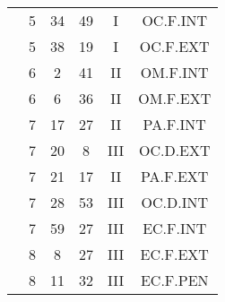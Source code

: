 \documentclass[12pt, a4paper]{article}
\begin{document}
\begin{multicols}{3}
{\begin{tabular}{c c c c c c}
	 	 	 	 & 5 & 34 & 49 & I & OC.F.INT\\%
	 	 	 	 & 5 & 38 & 19 & I & OC.F.EXT\\%
	 	 	 	 & 6 & 2 & 41 & II & OM.F.INT\\%
	 	 	 	 & 6 & 6 & 36 & II & OM.F.EXT\\%
	 	 	 	 & 7 & 17 & 27 & II & PA.F.INT\\%
	 	 	 	 & 7 & 20 & 8 & III & OC.D.EXT\\%
	 	 	 	 & 7 & 21 & 17 & II & PA.F.EXT\\%
	 	 	 	 & 7 & 28 & 53 & III & OC.D.INT\\%
	 	 	 	 & 7 & 59 & 27 & III & EC.F.INT\\%
	 	 	 	 & 8 & 8 & 27 & III & EC.F.EXT\\%
	 	 	 	 & 8 & 11 & 32 & III & EC.F.PEN\\%
	 	 \end{tabular}
 	}
\end{multicols}
\end{document}
